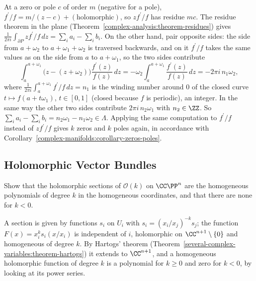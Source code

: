 \begin{solution}
At a zero or pole $c$ of order $m$ (negative for a pole), $f^{\prime}/f = m/(z - c) + (\text{holomorphic})$, so $zf^{\prime}/f$ has residue $mc$. The residue theorem in the plane
(Theorem~\ref{complex-analysis:theorem-residues}) gives $\frac{1}{2\pi i}\int_{\partial P}zf^{\prime}/f\,dz = \sum_ia_i - \sum_ib_i$. On the other hand, pair opposite sides: the side from $a + \omega_2$ to
$a + \omega_1 + \omega_2$ is traversed backwards, and on it $f^{\prime}/f$ takes the same values as on the side from $a$ to $a + \omega_1$, so the two sides contribute
\[
\int_a^{a+\omega_1}\bigl(z - (z + \omega_2)\bigr)\frac{f^{\prime}(z)}{f(z)}\,dz = -\omega_2\int_a^{a+\omega_1}\frac{f^{\prime}(z)}{f(z)}\,dz = -2\pi i\,n_1\omega_2,
\]
where $\frac{1}{2\pi i}\int_a^{a+\omega_1}f^{\prime}/f\,dz = n_1$ is the winding number around $0$ of the closed curve $t \mapsto f(a + t\omega_1)$, $t \in [0, 1]$ (closed because $f$ is periodic), an
integer. In the same way the other two sides contribute $2\pi i\,n_2\omega_1$ with $n_2 \in \ZZ$. So $\sum_ia_i - \sum_ib_i = n_2\omega_1 - n_1\omega_2 \in \Lambda$. Applying the same computation to
$f^{\prime}/f$ instead of $zf^{\prime}/f$ gives $k$ zeros and $k$ poles again, in accordance with Corollary~\ref{complex-manifolds:corollary-zeros-poles}.
\end{solution}

\subsection{Holomorphic Vector Bundles}\label{complex-manifolds:subsection-exercises-holomorphic-bundles}

\begin{exercise}\label{complex-manifolds:exercise-sections-ok}
Show that the holomorphic sections of $\mathcal{O}(k)$ on $\CC\PP^n$ are the homogeneous polynomials of degree $k$ in the homogeneous coordinates, and that there are none for $k < 0$.
\end{exercise}

\begin{solution}
A section is given by functions $s_i$ on $U_i$ with $s_i = (x_i/x_j)^{-k}s_j$; the function $F(x) = x_i^ks_i(x/x_i)$ is independent of $i$, holomorphic on $\CC^{n+1} \setminus \{0\}$ and homogeneous of degree
$k$. By Hartogs' theorem (Theorem~\ref{several-complex-variables:theorem-hartogs}) it extends to $\CC^{n+1}$, and a homogeneous holomorphic function of degree $k$ is a polynomial for $k \geq 0$ and zero for
$k < 0$, by looking at its power series.
\end{solution}

